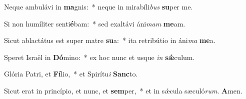 Neque ambulávi in \textbf{ma}gnis:~* neque in mirabíli\textit{bus} \textbf{su}per me.

Si non humíliter senti\textbf{é}bam:~* sed exaltávi áni\textit{mam} \textbf{me}am.

Sicut ablactátus est super matre \textbf{su}a:~* ita retribútio in áni\textit{ma} \textbf{me}a.

Speret Israël in \textbf{Dó}mino:~* ex hoc nunc et usque \textit{in} \textbf{sǽ}culum.

Glória Patri, et \textbf{Fí}lio,~* et Spirítu\textit{i} \textbf{Sanc}to.

Sicut erat in princípio, et nunc, et \textbf{sem}per,~* et in sǽcula sæculó\textit{rum}. \textbf{A}men.


